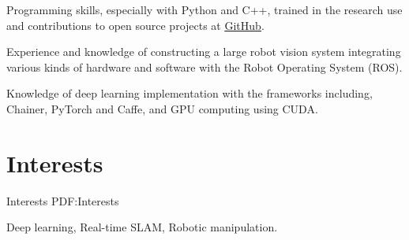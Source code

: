 \documentclass[letterpaper,MMMyyyy,nonstop]{simpleresumecv}
\begin{document}
\begin{body}
\BulletItem
Programming skills, especially with Python and C++,
trained in the research use and contributions to open source projects at
\href{http://github.com/wkentaro}{\underline{GitHub}}.

\BulletItem
Experience and knowledge of constructing a large robot vision system integrating various kinds of hardware and software
with the Robot Operating System (ROS).

\BulletItem
Knowledge of deep learning implementation with the frameworks including, Chainer, PyTorch and Caffe,
and GPU computing using CUDA.

%
%


\section
{Interests}
{Interests}
{PDF:Interests}

Deep learning,
Real-time SLAM,
Robotic manipulation.







\end{body}
\end{document}
